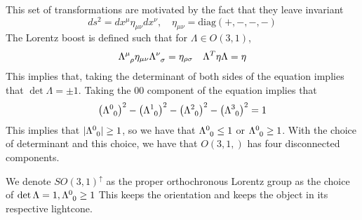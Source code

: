 \documentclass[11pt, oneside]{article}   	%
\theoremstyle{slanted}
\begin{document}
This set of transformations 
are motivated by the fact that 
they leave invariant 
\[
ds ^ 2  = dx^ \mu \eta _{ \mu \nu } dx ^ \nu , \quad \eta _{ \mu \nu }  = \text{diag}\left( 
+, - , - , - \right) 
\] The Lorentz boost is defined 
such that for $ \Lambda \in O \left( 3, 1  \right)  $, 
\[
\Lambda \indices{ ^ \mu _ \rho } \eta _{ \mu \nu } \Lambda \indices{ ^ \nu _ \sigma } 
= \eta_{ \rho \sigma } \quad \Lambda ^ T \eta \Lambda  =  \eta 
\] This implies that,
taking the determinant of both sides of the equation 
implies that $ \det \Lambda  = \pm 1 $. 
Taking the 00 component of the equation 
implies that 
\[
\left( \Lambda \indices{ ^ 0 _ 0 }   \right)  ^ 2  - \left( \Lambda 
\indices{ ^ 1 _ 0 }  \right)  ^ 2 - \left( \Lambda \indices{ ^ 2 _ 0 }   \right)  ^ 2 
 - \left( \Lambda \indices{ ^ 3 _ 0 }   \right)  ^ 2  = 1
\] This implies that $ | \Lambda \indices{ ^ 0 _ 0 } | \geq 1  $, 
so we have that $ \Lambda \indices{ ^ 0 _ 0 } \leq 1   $ 
or $ \Lambda \indices{ ^ 0 _ 0 } \geq 1   $. 
With the choice of determinant and 
this choice, 
we have that $ O \left( 3, 1,  \right)  $ has 
four disconnected components. 

We denote $ SO  (3, 1 ) ^{ \uparrow } $ 
as the proper orthochronous Lorentz group 
as the choice of $ \det \Lambda  = 1 , \Lambda \indices{ ^ 0 _ 0} \geq 1   $  
This keeps the orientation and keeps the object 
in its respective lightcone. 
\end{document}
